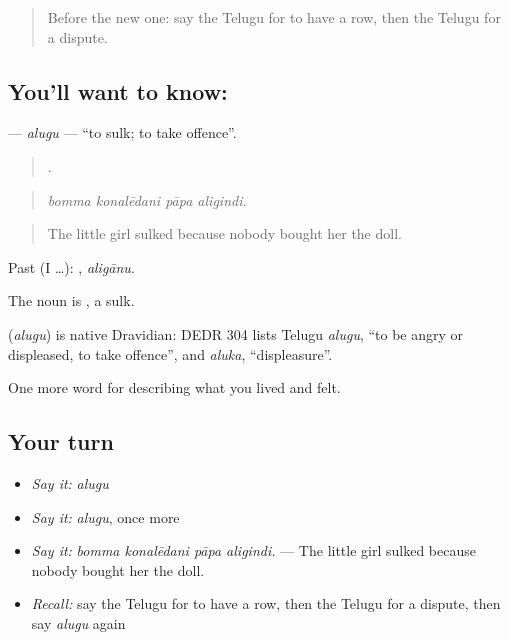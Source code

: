 \label{lesson:TE-C534-alugu}



\begin{quote}
Before the new one: say the Telugu for to have a row, then the Telugu for a dispute.
\end{quote}

\subsection*{You'll want to know: }
\textbf{} — \emph{alugu} — \textquotedblleft{}to sulk; to take offence\textquotedblright{}.

\begin{quote}
   .
\end{quote}

\begin{quote}
\emph{bomma konalēdani pāpa aligindi.}
\end{quote}

\begin{quote}
The little girl sulked because nobody bought her the doll.
\end{quote}

Past (I …): , \emph{aligānu}.

The noun is , a sulk.

\begin{cousinweb}
\textbf{} (\emph{alugu}) is native Dravidian: DEDR 304 lists Telugu \emph{alugu}, \textquotedblleft{}to be angry or displeased, to take offence\textquotedblright{}, and \emph{aluka}, \textquotedblleft{}displeasure\textquotedblright{}.
\end{cousinweb}

\begin{grammarlens}[title={What you've built}]
One more word for describing what you lived and felt.
\end{grammarlens}

\subsection*{Your turn}
\begin{itemize}
\raggedright
  \item \emph{Say it:} \emph{alugu}
  \item \emph{Say it:} \emph{alugu}, once more
  \item \emph{Say it:} \emph{bomma konalēdani pāpa aligindi.} — The little girl sulked because nobody bought her the doll.
  \item \emph{Recall:} say the Telugu for to have a row, then the Telugu for a dispute, then say \emph{alugu} again
\end{itemize}

